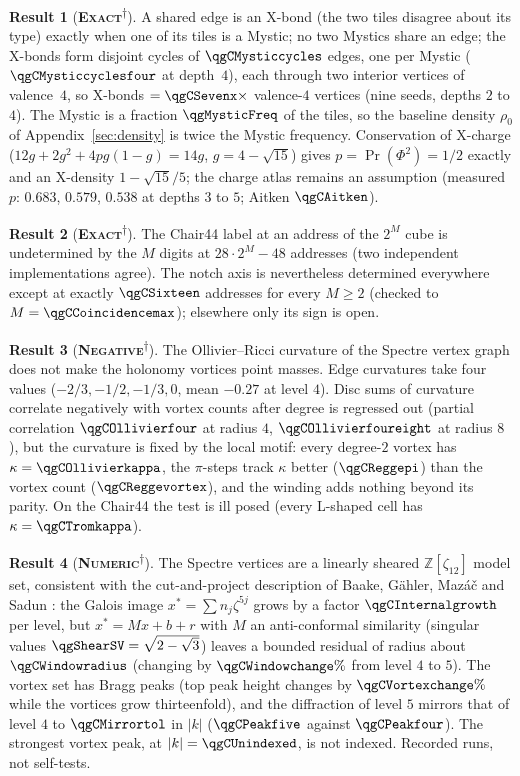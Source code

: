 \documentclass[11pt]{article}
\newcommand{\exact}{\textbf{\textsc{Exact}}}
\newcommand{\numeric}{\textbf{\textsc{Numeric}}}
\newcommand{\negres}{\textbf{\textsc{Negative}}}
\newcommand{\snap}{\textsuperscript{$\dagger$}}      %
\theoremstyle{definition}
\newtheorem{result}{Result}
\begin{document}
\begin{result}[\exact\snap]\label{res:mystic}
A shared edge is an X-bond (the two tiles disagree about its type) exactly when one of its tiles is a Mystic; no two Mystics share an edge; the X-bonds form disjoint cycles of $\qgCMysticcycles$ edges, one per Mystic ($\qgCMysticcyclesfour$ at depth~$4$), each through two interior vertices of valence~$4$, so X-bonds $=\qgCSevenx\times$ valence-$4$ vertices (nine seeds, depths $2$ to $4$). The Mystic is a fraction $\qgMysticFreq$ of the tiles, so the baseline density $\rho_0$ of Appendix~\ref{sec:density} is twice the Mystic frequency. Conservation of X-charge ($12g+2g^2+4pg(1-g)=14g$, $g=4-\sqrt{15}$) gives $p=\Pr(\Phi^2)=1/2$ exactly and an X-density $1-\sqrt{15}/5$; the charge atlas remains an assumption (measured $p$: $0.683$, $0.579$, $0.538$ at depths $3$ to $5$; Aitken $\qgCAitken$).
\end{result}
\begin{result}[\exact\snap]\label{res:chair-axis}
The Chair44 label at an address of the $2^M$ cube is undetermined by the $M$ digits at $28\cdot2^M-48$ addresses (two independent implementations agree). The notch axis is nevertheless determined everywhere except at exactly $\qgCSixteen$ addresses for every $M\ge2$ (checked to $M=\qgCCoincidencemax$); elsewhere only its sign is open.
\end{result}
\begin{result}[\negres\snap]\label{res:curv}
The Ollivier--Ricci curvature of the Spectre vertex graph does not make the holonomy vortices point masses. Edge curvatures take four values ($-2/3,-1/2,-1/3,0$, mean $-0.27$ at level $4$). Disc sums of curvature correlate negatively with vortex counts after degree is regressed out (partial correlation $\qgCOllivierfour$ at radius $4$, $\qgCOllivierfoureight$ at radius $8$), but the curvature is fixed by the local motif: every degree-$2$ vortex has $\kappa=\qgCOllivierkappa$, the $\pi$-steps track $\kappa$ better ($\qgCReggepi$) than the vortex count ($\qgCReggevortex$), and the winding adds nothing beyond its parity. On the Chair44 the test is ill posed (every L-shaped cell has $\kappa=\qgCTromkappa$).
\end{result}
\begin{result}[\numeric\snap]\label{res:bragg}
The Spectre vertices are a linearly sheared $\mathbb{Z}[\zeta_{12}]$ model set, consistent with the cut-and-project description of Baake, G\"ahler, Maz\'a\v{c} and Sadun \cite{bgms}: the Galois image $x^*=\sum n_j\zeta^{5j}$ grows by a factor $\qgCInternalgrowth$ per level, but $x^*=Mx+b+r$ with $M$ an anti-conformal similarity (singular values $\qgShearSV=\sqrt{2-\sqrt3}$) leaves a bounded residual of radius about $\qgCWindowradius$ (changing by $\qgCWindowchange\%$ from level $4$ to $5$). The vortex set has Bragg peaks (top peak height changes by $\qgCVortexchange\%$ while the vortices grow thirteenfold), and the diffraction of level $5$ mirrors that of level $4$ to $\qgCMirrortol$ in $|k|$ ($\qgCPeakfive$ against $\qgCPeakfour$). The strongest vortex peak, at $|k|=\qgCUnindexed$, is not indexed. Recorded runs, not self-tests.
\end{result}
\end{document}
